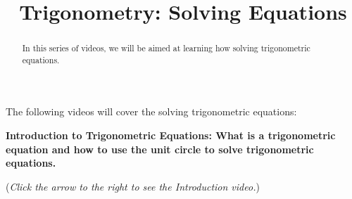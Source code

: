 \documentclass{ximera}
\title[Prerequisite Videos: ]{Trigonometry: Solving Equations}
\begin{document}
\begin{abstract}
  In this series of videos, we will be aimed at learning how
  solving trigonometric equations.
\end{abstract}
\maketitle

The following videos will cover the solving trigonometric equations:

\textbf{Introduction to Trigonometric Equations: What is a trigonometric
equation and how to use the unit circle to solve trigonometric equations.}
\begin{flushright}
{\color{blue}(\emph{Click the arrow to the right to see the Introduction video.})}
\end{flushright}
\begin{center}
\begin{expandable}
\end{expandable}
\end{center}

\bigskip
\end{document}
